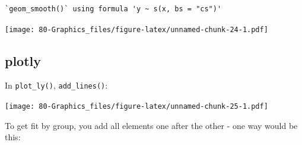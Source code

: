 \documentclass[
]{book}
\newenvironment{Shaded}{\begin{snugshade}}{\end{snugshade}}
\newcommand{\AttributeTok}[1]{\textcolor[rgb]{0.77,0.63,0.00}{#1}}
\newcommand{\FunctionTok}[1]{\textcolor[rgb]{0.00,0.00,0.00}{#1}}
\newcommand{\NormalTok}[1]{#1}
\newcommand{\OtherTok}[1]{\textcolor[rgb]{0.56,0.35,0.01}{#1}}
\newcommand{\SpecialCharTok}[1]{\textcolor[rgb]{0.00,0.00,0.00}{#1}}
\newcommand{\StringTok}[1]{\textcolor[rgb]{0.31,0.60,0.02}{#1}}
\begin{document}
\begin{verbatim}
`geom_smooth()` using formula 'y ~ s(x, bs = "cs")'
\end{verbatim}

\texttt{[image: 80-Graphics\_files/figure-latex/unnamed-chunk-24-1.pdf]}

\hypertarget{plotly-1}{%
\subsection{\texorpdfstring{\textbf{plotly}}{plotly}}\label{plotly-1}}

In \texttt{plot\_ly()}, \texttt{add\_lines()}:

\begin{Shaded}
\end{Shaded}

\texttt{[image: 80-Graphics\_files/figure-latex/unnamed-chunk-25-1.pdf]}

To get fit by group, you add all elements one after the other - one way would be this:
\end{document}
